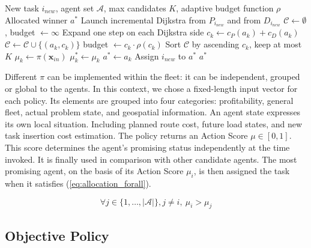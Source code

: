 \documentclass[sigconf]{acmart}
\begin{document}
\begin{algorithm}[!htbp]
\caption{Task Allocation Module}
\label{alg:tam-mc-formatA}
\begin{algorithmic}[1]
\REQUIRE New task $i_{new}$, agent set $\mathcal{A}$, max candidates $K$, adaptive budget function $\rho$
\ENSURE Allocated winner $a^*$
\STATE Launch incremental Dijkstra from $P_{i_{new}}$ and from $D_{i_{new}}$
\STATE $\mathcal{C} \gets \emptyset$, budget $\gets \infty$
\REPEAT
    \STATE Expand one step on each Dijkstra side
        \STATE $c_k \gets c_P(a_k) + c_D(a_k)$
        \STATE $\mathcal{C} \gets \mathcal{C} \cup \{(a_k, c_k)\}$
            \STATE budget $\gets c_k \cdot \rho(c_k)$
        \ENDIF
    \ENDIF
{}
\STATE Sort $\mathcal{C}$ by ascending $c_k$, keep at most $K$
    \STATE $\mu_k \gets \pi(\mathbf{x}_{\mathit{in}})$
        \STATE $\mu_k^* \gets \mu_k$
        \STATE $a^* \gets a_k$
    \ENDIF
\ENDFOR
\STATE Assign $i_{new}$ to $a^*$
\RETURN $a^*$
\end{algorithmic}
\end{algorithm}

Different $\pi$ can be implemented within the fleet: it can be independent, grouped or global to the agents. In this context, we chose a fixed-length input vector for each policy. Its elements are grouped into four categories: profitability, general fleet, actual problem state, and geospatial information. An agent state expresses its own local situation. Including planned route cost, future load states, and new task insertion cost estimation. The policy returns an Action Score $\mu \in [0, 1]$. This score determines the agent’s promising status independently at the time invoked. It is finally used in comparison with other candidate agents. The most promising agent, on the basis of its Action Score $\mu_i$, is then assigned the task when it satisfies (\ref{eq:allocation_forall}).

\begin{equation}
\forall j\in \{1,\dots,\lvert \mathcal{A} \rvert \}, j \neq i, \ \mu_i > \mu_j
\label{eq:allocation_forall}
\end{equation}

\subsection{Objective Policy}
\end{document}
